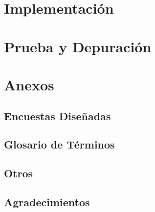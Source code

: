 \documentclass[12pt,a4paper]{book}
\begin{document}
	\part{Implementación}
	\part{Prueba y Depuración}
	\appendix
	\part{Anexos}
	\chapter[Encuestas]{Encuestas Diseñadas}
	
	\chapter[Glosario]{Glosario de Términos}
  \printnoidxglossary[type=\acronymtype,title=Siglas,nonumberlist]
  \printnoidxglossary[title=Definiciones,nonumberlist]
	\chapter{Otros}
	\backmatter
	\chapter{Agradecimientos}
\end{document}
